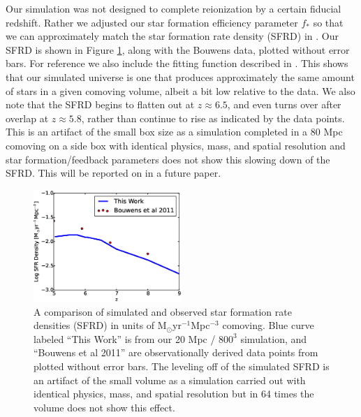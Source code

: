 Our simulation was not designed to complete reionization by a certain fiducial redshift. Rather we adjusted our star formation efficiency parameter $f_*$ so that we can approximately match the star formation rate density (SFRD) in \citep{BouwensEtAl2011}.  Our SFRD is shown in Figure \ref{SFR}, along with the Bouwens data, plotted without error bars. For reference we also include the fitting function described in \citep{HaardtMadau2012}.  This shows that our simulated universe is one that produces approximately the same amount of stars in a given comoving volume, albeit a bit low relative to the data. We also note that the SFRD begins to flatten out at $z \approx 6.5$, and even turns over after overlap at $z \approx 5.8$, rather than continue to rise as indicated by the data points.  This is an artifact of the small box size as a simulation completed in a 80 Mpc comoving on a side box with identical physics, mass, and spatial resolution and star formation/feedback parameters does not show this slowing down of the SFRD. This will be reported on in a future paper. 

\begin{figure}
	\includegraphics[width=0.5\textwidth]{compareSFR_haardt_madau2012.eps}
	\caption{A comparison of simulated and observed star formation rate densities (SFRD) in units of M$_\odot$yr$^{-1}$Mpc$^{-3}$ comoving.  Blue curve labeled ``This Work'' is from our 20 Mpc / $800^3$ simulation, and ``Bouwens et al 2011'' are observationally derived data points from \cite{BouwensEtAl2011b} plotted without error bars. The leveling off of the simulated SFRD is an artifact of the small volume as a simulation carried out with identical physics, mass, and spatial resolution but in 64 times the volume does not show this effect.}
	\label{SFR}
\end{figure}


